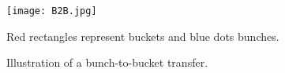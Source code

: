 %
%
%
\begin{figure}[H]
   \centering   
   \texttt{[image: B2B.jpg]}
   \caption{Illustration of a bunch-to-bucket transfer.}{Red rectangles represent buckets and blue dots bunches.}
   \label{B2B}
\end{figure}


